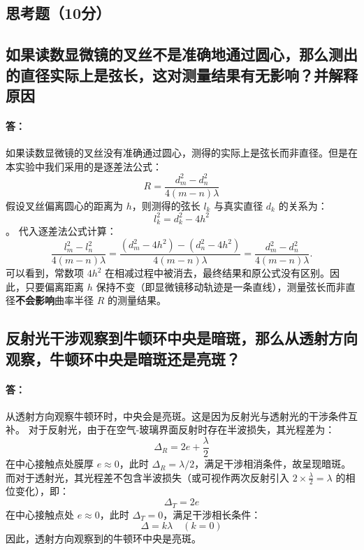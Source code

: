 \documentclass[]{../template/Report}%
\begin{document}
\begin{fullreportonly}
\section{思考题（10分）}
\subsection{如果读数显微镜的叉丝不是准确地通过圆心，那么测出的直径实际上是弦长，这对测量结果有无影响？并解释原因}
\paragraph{答：}如果读数显微镜的叉丝没有准确通过圆心，测得的实际上是弦长而非直径。但是在本实验中我们采用的是逐差法公式：
\[R = \frac{d_m^2 - d_n^2}{4(m-n)\lambda}\]
假设叉丝偏离圆心的距离为 $h$，则测得的弦长 $l_k$ 与真实直径 $d_k$ 的关系为：
\[l_k^2 = d_k^2 - 4h^2\]。
代入逐差法公式计算：
\[
\frac{l_m^2 - l_n^2}{4(m-n)\lambda} = \frac{(d_m^2 - 4h^2) - (d_n^2 - 4h^2)}{4(m-n)\lambda} = \frac{d_m^2 - d_n^2}{4(m-n)\lambda}.
\]
可以看到，常数项 $4h^2$ 在相减过程中被消去，最终结果和原公式没有区别。因此，只要偏离距离 $h$ 保持不变（即显微镜移动轨迹是一条直线），测量弦长而非直径\textbf{不会影响}曲率半径 $R$ 的测量结果。

\subsection{反射光干涉观察到牛顿环中央是暗斑，那么从透射方向观察，牛顿环中央是暗斑还是亮斑？}
\paragraph{答：}从透射方向观察牛顿环时，中央会是亮斑。这是因为反射光与透射光的干涉条件互补。
对于反射光，由于在空气-玻璃界面反射时存在半波损失，其光程差为：
\[ \Delta_R = 2e + \frac{\lambda}{2} \]
在中心接触点处膜厚 $e \approx 0$，此时 $\Delta_R = \lambda/2$，满足干涉相消条件，故呈现暗斑。
而对于透射光，其光程差不包含半波损失（或可视作两次反射引入 $2 \times \frac{\lambda}{2} = \lambda$ 的相位变化），即：
\[ \Delta_T = 2e \]
在中心接触点处 $e \approx 0$，此时 $\Delta_T = 0$，满足干涉相长条件：
\[ \Delta = k\lambda \quad (k=0) \]
因此，透射方向观察到的牛顿环中央是亮斑。
\end{fullreportonly}
\insertnotes
\end{document}
